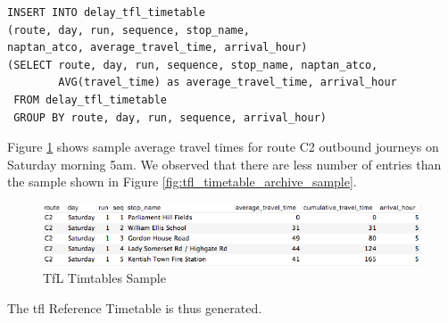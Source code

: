 \begin{enumerate}
\begin{verbatim}
INSERT INTO delay_tfl_timetable
(route, day, run, sequence, stop_name,
naptan_atco, average_travel_time, arrival_hour)
(SELECT route, day, run, sequence, stop_name, naptan_atco,
        AVG(travel_time) as average_travel_time, arrival_hour
 FROM delay_tfl_timetable
 GROUP BY route, day, run, sequence, arrival_hour)
\end{verbatim}

    Figure \ref{fig:tfl_timetable_sample} shows sample average travel times for route C2 outbound journeys on Saturday morning 5am. We observed that there are less number of entries than the sample shown in Figure \ref{fig:tfl_timetable_archive_sample}.

\begin{figure}
\centering
\includegraphics[width=\textwidth]{figures/delay_tfl_timetable_sample.png}
\caption{\label{fig:tfl_timetable_sample} TfL Timtables Sample}
\end{figure}

\end{enumerate}

The \acrshort{tfl} Reference Timetable is thus generated.




